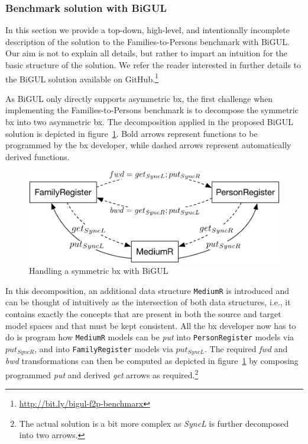 \subsubsection{Benchmark solution with BiGUL}

In this section we provide a top-down, high-level, and intentionally incomplete description of the solution to the Families-to-Persons benchmark with BiGUL.
Our aim is not to explain all details, but rather to impart an intuition for the basic structure of the solution.
We refer the reader interested in further details to the BiGUL solution available on GitHub.\footnote{\url{http://bit.ly/bigul-f2p-benchmarx}}

As BiGUL only directly supports asymmetric bx, the first challenge when implementing the Families-to-Persons benchmark is to decompose the symmetric bx into two asymmetric bx.
The decomposition applied in the proposed BiGUL solution is depicted in figure~\ref{fig:bigulSolnOverview}.
Bold arrows represent functions to be programmed by the bx developer, while dashed arrows represent automatically derived functions.
%
\begin{figure}[!tbp]
    \centering
    \includegraphics[width=\columnwidth]{diagrams/solutions/bigulSolnOverview}
    \caption{Handling a symmetric bx with BiGUL}
    \label{fig:bigulSolnOverview}
\end{figure}
%
In this decomposition, an additional data structure \texttt{MediumR} is introduced and can be thought of intuitively as the intersection of both data structures, i.e., it contains exactly the concepts that are present in both the source and target model spaces and that must be kept consistent.
All the bx developer now has to do is program how \texttt{MediumR} models can be \emph{put} into \texttt{Person\-Regis\-ter} models via $put_{SyncR}$, and into \texttt{Family\-Regis\-ter} models via $put_{SyncL}$.
The required \emph{fwd} and \emph{bwd} transformations can then be computed as depicted in figure~\ref{fig:bigulSolnOverview} by composing programmed \emph{put} and derived \emph{get} arrows as required.\footnote{The actual solution is a bit more complex as \emph{SyncL} is further decomposed into two arrows.}

